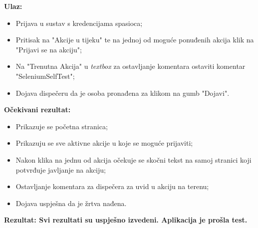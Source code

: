 			 \textbf{Ulaz:}
			 \begin{itemize}
			 	\item {Prijava u sustav s kredencijama spasioca;}
			 	\item {Pritisak na "Akcije u tijeku" te na jednoj od moguće ponuđenih akcija klik na "Prijavi se na akciju";}
			 	\item {Na "Trenutna Akcija" u \textit{textbox} za ostavljanje komentara ostaviti komentar "SeleniumSelfTest";}
			 	\item {Dojava dispečeru da je osoba pronađena za klikom na gumb "Dojavi".}
			 \end{itemize}
		 	\textbf{Očekivani rezultat:}
		 	\begin{itemize}
		 		\item {Prikazuje se početna stranica;}
		 		\item {Prikazuju se sve aktivne akcije u koje se moguće prijaviti;}
		 		\item {Nakon klika na jednu od akcija očekuje se skočni tekst na samoj stranici koji potvrđuje javljanje na akciju;}
		 		\item {Ostavljanje komentara za dispečera za uvid u akciju na terenu;}
		 		\item {Dojava uspješna da je žrtva nađena.}
		 	\end{itemize}
	 		{\textbf{Rezultat: Svi rezultati su uspješno izvedeni. Aplikacija je prošla test.}}
	 		
